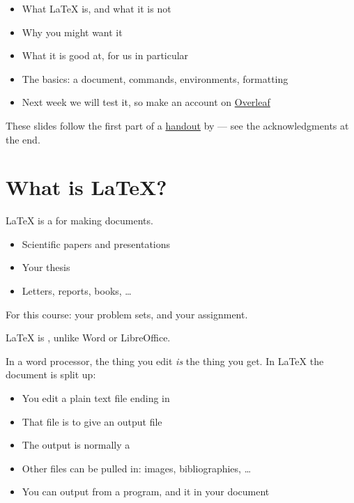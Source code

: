 \documentclass[a4paper,landscape,headrule,footrule]{foils}
\begin{document}
\maketitle

\begin{itemize}
\item What LaTeX is, and what it is not
\item Why you might want it
\item What it is good at, for us in particular
\item The basics: a document, commands, environments, formatting
\item Next week we will test it, so make an account on \href{https://overleaf.com}{Overleaf}
\end{itemize}

\bigskip
These slides follow the first part of a \href{https://andras.barany.at/files/sgsah-latex-intro-handout.pdf}{handout} by 
--- see the acknowledgments at the end.

\section{What is LaTeX?}


LaTeX is a  for making documents.

\begin{itemize}
\item Scientific papers and presentations
\item Your thesis
\item Letters, reports, books, \ldots
\end{itemize}

\bigskip
For this course: your problem sets, and your assignment.


LaTeX is  , unlike Word or
LibreOffice.

\bigskip
In a word processor, the thing you edit \emph{is} the thing you get.
In LaTeX the document is split up:

\begin{itemize}
\item You edit a plain text file ending in 
\item That file is  to give an output file
\item The output is normally a 
\item Other files can be pulled in: images, bibliographies, \ldots
\item You can output   from a program, and  it in your document
  
\end{itemize}
\end{document}
